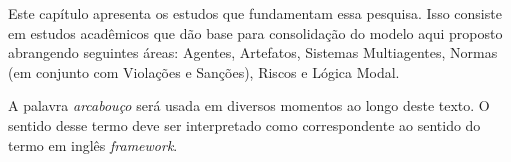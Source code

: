 Este capítulo apresenta os estudos que fundamentam essa pesquisa. Isso consiste em estudos acadêmicos que dão base para consolidação do modelo aqui proposto abrangendo seguintes áreas: Agentes, Artefatos, Sistemas Multiagentes, Normas (em conjunto com Violações e Sanções), Riscos e Lógica Modal. 

A palavra \textit{arcabouço} será usada em diversos momentos ao longo deste texto. O sentido desse termo deve ser interpretado como correspondente ao sentido do termo em inglês \textit{framework}.